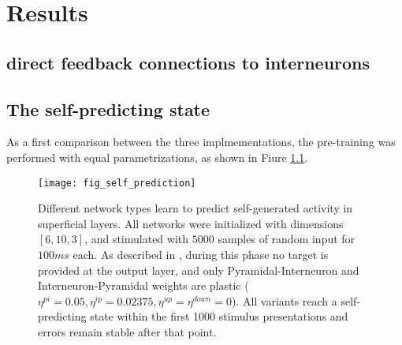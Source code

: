 
\chapter{Results}





\section{direct feedback connections to interneurons}\label{sec-electric-syns}

\cite{Vaughn2022,Mancilla2007}


\section{The self-predicting state}

As a first comparison between the three implmementations, the pre-training was performed with equal parametrizations, as
shown in Fiure \ref{fig-self-pred}.



\begin{figure}[t]
    \centering
    \texttt{[image: fig\_self\_prediction]}
    \caption{Different network types learn to predict self-generated activity in superficial layers. All networks were
        initialized with dimensions $[6, 10, 3]$, and stimulated with $5000$ samples of random input for $100ms$ each.
        As described in \cite{sacramento2018dendritic}, during this phase no target is provided at the output layer, and
        only Pyramidal-Interneuron and Interneuron-Pyramidal weights are plastic ($\eta^{pi}=0.05, \eta^{ip}=0.02375,
        \eta^{up}=\eta^{down}=0$). All variants reach a self-predicting state within the first 1000 stimulus
        presentations and errors remain stable after that point.}
    \label{fig-self-pred}
\end{figure}

